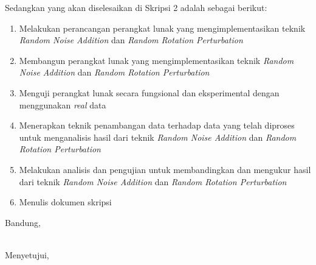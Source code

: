 \documentclass[a4paper,twoside]{article}
\begin{document}
Sedangkan yang akan diselesaikan di Skripsi 2 adalah sebagai berikut:
\begin{enumerate}
	\item Melakukan perancangan perangkat lunak yang mengimplementasikan teknik \textit{Random Noise Addition} dan \textit{Random Rotation Perturbation}
	\item Membangun perangkat lunak yang mengimplementasikan teknik \textit{Random Noise Addition} dan \textit{Random Rotation Perturbation}
	\item Menguji perangkat lunak secara fungsional dan eksperimental dengan menggunakan \textit{real} data
	\item Menerapkan teknik penambangan data terhadap data yang telah diproses untuk menganalisis hasil dari teknik \textit{Random Noise Addition} dan \textit{Random Rotation Perturbation}
	\item Melakukan analisis dan pengujian untuk membandingkan dan mengukur hasil dari teknik \textit{Random Noise Addition} dan \textit{Random Rotation Perturbation}
	\item Menulis dokumen skripsi
\end{enumerate}

\vspace{1cm}
\centering Bandung, \tanggal\\
\vspace{2cm} \nama \\ 
\vspace{1cm}

Menyetujui, \\
\end{document}

